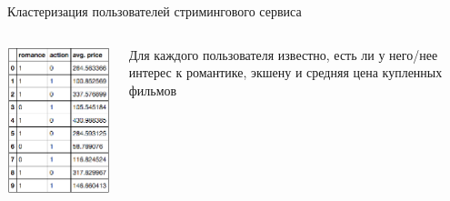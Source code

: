 \documentclass[aspectratio=169]{beamer}
\begin{document}
\begin{frame}{Кластеризация пользователей стримингового сервиса}

\begin{columns}[T]
    \begin{column}{.5\textwidth}
    \begin{center}
   		\includegraphics[scale=0.5]{images/movies_data.png}
    \end{center}
    \end{column}

    \begin{column}{.5\textwidth}
	Для каждого пользователя известно, есть ли у него/нее интерес к романтике, экшену и средняя цена купленных фильмов
    \end{column}
  \end{columns}

\end{frame}
\end{document}
